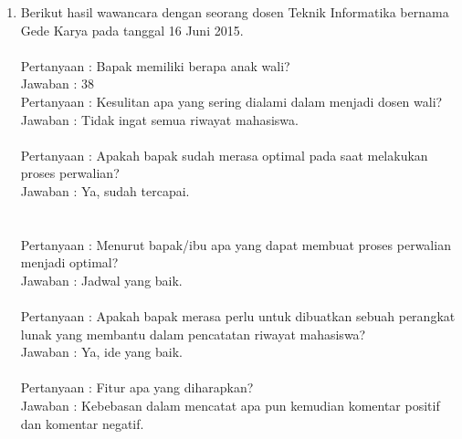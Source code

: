 \begin{enumerate}
\item Berikut hasil wawancara dengan seorang dosen Teknik Informatika bernama Gede Karya pada tanggal 16 Juni 2015.\\\\
Pertanyaan : Bapak memiliki berapa anak wali?\\
Jawaban : 38\\
Pertanyaan : Kesulitan apa yang sering dialami dalam menjadi dosen wali?\\
Jawaban : Tidak ingat semua riwayat mahasiswa.\\\\
Pertanyaan : Apakah bapak sudah merasa optimal pada saat melakukan proses perwalian?\\
Jawaban : Ya, sudah tercapai.\\\\\\
Pertanyaan : Menurut bapak/ibu apa yang dapat membuat proses perwalian menjadi optimal?\\
Jawaban : Jadwal yang baik.\\\\
Pertanyaan : Apakah bapak merasa perlu untuk dibuatkan sebuah perangkat lunak yang membantu dalam pencatatan riwayat mahasiswa?\\
Jawaban : Ya, ide yang baik.\\\\
Pertanyaan : Fitur apa yang diharapkan?\\
Jawaban : Kebebasan dalam mencatat apa pun kemudian komentar positif dan komentar negatif.\\


\end{enumerate}
